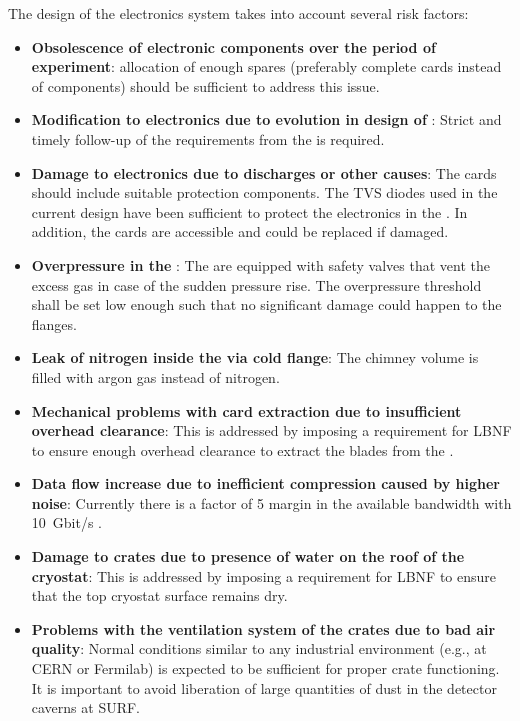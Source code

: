 The design of the \dual electronics system takes into account several risk factors:
\begin{itemize}
\item{\textbf{Obsolescence of electronic components over the period of experiment}: allocation of enough spares (preferably complete cards instead of components) should be sufficient to address this issue. }

\item{\textbf{Modification to  electronics due to evolution in design of }: Strict and timely follow-up of the  requirements from the \dual {} is required.}

\item{\textbf{Damage to electronics due to  discharges or other causes}: %
The  cards should include suitable protection components. The TVS diodes used in the current design  have been sufficient to protect the electronics in the . 
 In addition, the cards are accessible and could be replaced if damaged. }
 
\item{\textbf{Overpressure in the }: The  are equipped with safety valves that vent the excess gas in case of the sudden pressure rise. The overpressure threshold %
shall be set low enough such that no significant damage could happen to the flanges. }

\item{\textbf{Leak of nitrogen inside the  via cold flange}: The chimney volume %
is  filled with argon gas instead of nitrogen.}

\item{\textbf{Mechanical problems with  card extraction due to insufficient overhead clearance}: %
This is addressed by imposing a requirement for LBNF to ensure enough overhead clearance to extract the blades from the .}
\item{\textbf{Data flow increase due to inefficient compression caused by higher noise}: Currently there is a factor of \num{5} margin in the available bandwidth with \SI{10}{Gbit/s} .} 
\item{\textbf{Damage to  crates due to presence of water on the roof of the cryostat}: This is addressed by imposing a requirement for LBNF to ensure that the top cryostat surface remains dry.}
\item{\textbf{Problems with the ventilation system of the  crates due to bad air quality}: Normal conditions similar to any industrial environment (e.g., at CERN or Fermilab) %
is expected to be sufficient %
for proper crate functioning. It is important to avoid liberation of large quantities of dust in the detector caverns at SURF.} %
\end{itemize}
